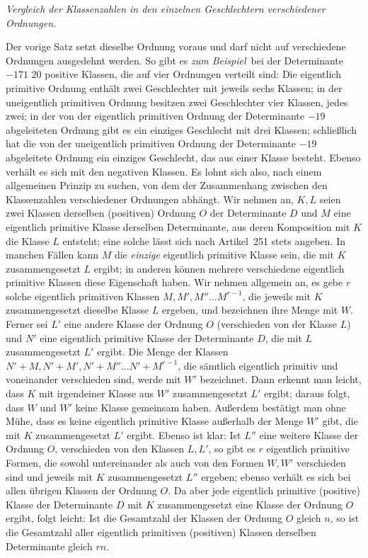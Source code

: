 \begin{center}
\textit{Vergleich der Klassenzahlen in den einzelnen Geschlechtern verschiedener Ordnungen.}
\end{center}

Der vorige Satz setzt dieselbe Ordnung voraus und darf nicht auf verschiedene Ordnungen ausgedehnt werden. So gibt es \textit{zum Beispiel}\ bei der Determinante $-171$ $20$ positive Klassen, die auf vier Ordnungen verteilt sind: Die eigentlich primitive Ordnung enthält zwei Geschlechter mit jeweils sechs Klassen; in der uneigentlich primitiven Ordnung besitzen zwei Geschlechter vier Klassen, jedes zwei; in der von der eigentlich primitiven Ordnung der Determinante $-19$ abgeleiteten Ordnung gibt es ein einziges Geschlecht mit drei Klassen; schließlich hat die von der uneigentlich primitiven Ordnung der Determinante $-19$ abgeleitete Ordnung ein einziges Geschlecht, das aus einer Klasse besteht. Ebenso verhält es sich mit den negativen Klassen. Es lohnt sich also, nach einem allgemeinen Prinzip zu suchen, von dem der Zusammenhang zwischen den Klassenzahlen verschiedener Ordnungen abhängt. Wir nehmen an, $K,L$ seien zwei Klassen derselben (positiven) Ordnung $O$ der Determinante $D$ und $M$ eine eigentlich primitive Klasse derselben Determinante, aus deren Komposition mit $K$ die Klasse $L$ entsteht; eine solche lässt sich nach Artikel~251 stets angeben. In manchen Fällen kann $M$ die \textit{einzige} eigentlich primitive Klasse sein, die mit $K$ zusammengesetzt $L$ ergibt; in anderen können mehrere verschiedene eigentlich primitive Klassen diese Eigenschaft haben. Wir nehmen allgemein an, es gebe $r$ solche eigentlich primitiven Klassen $M,M',M''\ldots M^{r-1}$, die jeweils mit $K$ zusammengesetzt dieselbe Klasse $L$ ergeben, und bezeichnen ihre Menge mit $W$. Ferner sei $L'$ eine andere Klasse der Ordnung $O$ (verschieden von der Klasse $L$) und $N'$ eine eigentlich primitive Klasse der Determinante $D$, die mit $L$ zusammengesetzt $L'$ ergibt. Die Menge der Klassen $N'+M,N'+M',N'+M''\ldots N'+M^{r-1}$, die sämtlich eigentlich primitiv und voneinander verschieden sind, werde mit $W'$ bezeichnet. Dann erkennt man leicht, dass $K$ mit irgendeiner Klasse aus $W'$ zusammengesetzt $L'$ ergibt; daraus folgt, dass $W$ und $W'$ keine Klasse gemeinsam haben. Außerdem bestätigt man ohne Mühe, dass es keine eigentlich primitive Klasse außerhalb der Menge $W'$ gibt, die mit $K$ zusammengesetzt $L'$ ergibt. Ebenso ist klar: Ist $L''$ eine weitere Klasse der Ordnung $O$, verschieden von den Klassen $L,L'$, so gibt es $r$ eigentlich primitive Formen, die sowohl untereinander als auch von den Formen $W,W'$ verschieden sind und jeweils mit $K$ zusammengesetzt $L''$ ergeben; ebenso verhält es sich bei allen übrigen Klassen der Ordnung $O$. Da aber jede eigentlich primitive (positive) Klasse der Determinante $D$ mit $K$ zusammengesetzt eine Klasse der Ordnung $O$ ergibt, folgt leicht: Ist die Gesamtzahl der Klassen der Ordnung $O$ gleich $n$, so ist die Gesamtzahl aller eigentlich primitiven (positiven) Klassen derselben Determinante gleich $rn$.

